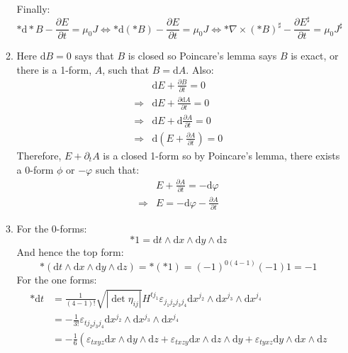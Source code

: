 \documentclass[12pt,a4]{article}
\newcommand{\e}{\mathrm{d}}
\begin{document}
\begin{enumerate}
\begin{enumerate}
\begin{equation*}
        \end{equation*}
        Finally:
        \begin{equation*}
          * \e * B - \frac{\partial E}{\partial t} = \mu_0 J \Leftrightarrow * \e (* B) - \frac{\partial E}{\partial t} = \mu_0 J \Leftrightarrow * \nabla \times (*B)^\sharp - \frac{\partial E^\sharp}{\partial t} = \mu_0 J^\sharp
        \end{equation*}
      \item
        Here $\e B = 0$ says that $B$ is closed so Poincare's lemma says $B$ is exact, or there is a 1-form, $A$, such that $B = \e A$.
        Also:
        \begin{align*}
                      & \e E + \frac{\partial B}{\partial t} = 0\\
          \Rightarrow & \e E + \frac{\partial \e A}{\partial t} = 0\\
          \Rightarrow & \e E + \e \frac{\partial A}{\partial t} = 0\\
          \Rightarrow & \e \left(E + \frac{\partial A}{\partial t}\right) = 0
        \end{align*}
        Therefore, $E + \partial_t A$ is a closed 1-form so by Poincare's lemma, there exists a 0-form $\phi$ or $-\varphi$ such that:
        \begin{align*}
                      & E + \frac{\partial A}{\partial t} = - \e \varphi\\
          \Rightarrow & E  = - \e \varphi - \frac{\partial A}{\partial t}
        \end{align*}
      \item
        For the 0-forms:
        \begin{equation*}
          *1 = \e t \wedge \e x \wedge \e y \wedge \e z
        \end{equation*}
        And hence the top form:
        \begin{equation*}
          *(\e t \wedge \e x \wedge \e y \wedge \e z) = *(*1) = (-1)^{0(4-1)}(-1) 1 = -1
        \end{equation*}
        For the one forms:
        \begin{align*}
          *\e t
                 &= \frac{1}{(4 - 1)!} \sqrt{|\det{\eta_{ij}}|} H^{t j_1} \varepsilon_{j_1 j_2 j_3 j_4} \e x^{j_2} \wedge \e x^{j_3} \wedge \e x^{j_4}\\
                 &= - \frac{1}{3!}  \varepsilon_{t j_2 j_3 j_4} \e x^{j_2} \wedge \e x^{j_3} \wedge \e x^{j_4}\\
                 &= - \frac{1}{6}  \left(\varepsilon_{t x y z} \e x \wedge \e y \wedge \e z + \varepsilon_{t x z y} \e x \wedge \e z \wedge \e y + \varepsilon_{t y x z} \e y \wedge \e x \wedge \e z\right.\\

\end{align*}
\end{enumerate}
\end{enumerate}
\end{document}
